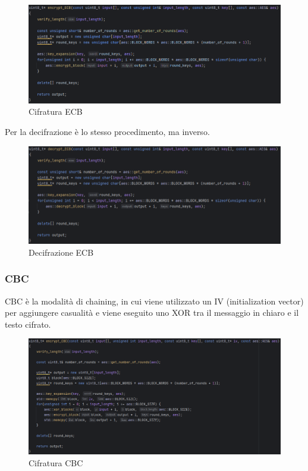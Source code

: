 \begin{figure}[H]
	\centering
	\includegraphics[width=1\textwidth, height=1\textheight, keepaspectratio]{./images/code/cpp/modes/encrypt_ECB.PNG}
	\caption{Cifratura ECB}
	\label{fig:encrypt_ECB}
\end{figure}

\textsf{\small Per la decifrazione è lo stesso procedimento, ma inverso. }

\begin{figure}[H]
	\centering
	\includegraphics[width=1\textwidth, height=1\textheight, keepaspectratio]{./images/code/cpp/modes/decrypt_ECB.PNG}
	\caption{Decifrazione ECB}
	\label{fig:decrypt_ECB}
\end{figure}

\subsubsection{CBC}

  

\textsf{\small CBC è la modalità di chaining, in cui viene utilizzato un IV (initialization vector) per aggiungere casualità e viene eseguito uno XOR tra il messaggio in chiaro e il testo cifrato.}

\begin{figure}[H]
	\centering
	\includegraphics[width=1\textwidth, height=1\textheight, keepaspectratio]{./images/code/cpp/modes/encrypt_CBC.PNG}
	\caption{Cifratura CBC}
	\label{fig:encrypt_CBC}
\end{figure}

